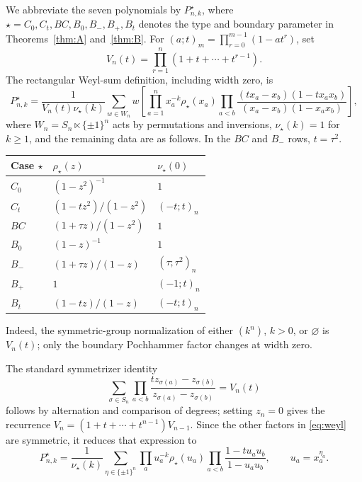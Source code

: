 \documentclass[12pt]{article}
\numberwithin{equation}{section}
\begin{document}
We abbreviate the seven polynomials by $P^\star_{n,k}$, where
$\star=C_0,C_t,BC,B_0,B_-,B_+,B_t$ denotes the type and boundary
parameter in Theorems~\ref{thm:A} and~\ref{thm:B}.
For $(a;t)_m=\prod_{r=0}^{m-1}(1-at^r)$, set
\[
 V_n(t)=\prod_{r=1}^n(1+t+\cdots+t^{r-1}).
\]
The rectangular Weyl-sum definition, including width zero, is
\begin{equation}\label{eq:weyl}
 P^\star_{n,k}
 =\frac{1}{V_n(t)\nu_\star(k)}
 \sum_{w\in W_n}w\left[
 \prod_{a=1}^n x_a^{-k}\rho_\star(x_a)
 \prod_{a<b}\frac{(tx_a-x_b)(1-tx_ax_b)}
                    {(x_a-x_b)(1-x_ax_b)}\right],
\end{equation}
where $W_n=S_n\ltimes\{\pm1\}^n$ acts by permutations and inversions,
$\nu_\star(k)=1$ for $k\ge1$, and the remaining data are as follows.
In the $BC$ and $B_-$ rows, $t=\tau^2$.
\begin{center}
\renewcommand{\arraystretch}{1.35}
\begin{tabular}{@{}lll@{}}
\toprule
Case $\star$ & $\rho_\star(z)$ & $\nu_\star(0)$\\
\midrule
$C_0$ & $(1-z^2)^{-1}$ & $1$\\
$C_t$ & $(1-tz^2)/(1-z^2)$ & $(-t;t)_n$\\
$BC$ & $(1+\tau z)/(1-z^2)$ & $1$\\
$B_0$ & $(1-z)^{-1}$ & $1$\\
$B_-$ & $(1+\tau z)/(1-z)$ & $(\tau;\tau^2)_n$\\
$B_+$ & $1$ & $(-1;t)_n$\\
$B_t$ & $(1-tz)/(1-z)$ & $(-t;t)_n$\\
\bottomrule
\end{tabular}
\end{center}
Indeed, the symmetric-group normalization of either $(k^n)$, $k>0$,
or $\varnothing$ is $V_n(t)$; only the boundary Pochhammer factor
changes at width zero.

The standard symmetrizer identity
\[
 \sum_{\sigma\in S_n}
 \prod_{a<b}\frac{tz_{\sigma(a)}-z_{\sigma(b)}}
                  {z_{\sigma(a)}-z_{\sigma(b)}}=V_n(t)
\]
follows by alternation and comparison of degrees; setting $z_n=0$
gives the recurrence $V_n=(1+t+\cdots+t^{n-1})V_{n-1}$.
Since the other factors in \eqref{eq:weyl} are symmetric, it reduces
that expression to
\begin{equation}\label{eq:signsum}
 P^\star_{n,k}
 =\frac{1}{\nu_\star(k)}
   \sum_{\eta\in\{\pm1\}^n}
   \prod_a u_a^{-k}\rho_\star(u_a)
   \prod_{a<b}\frac{1-tu_au_b}{1-u_au_b},
 \qquad u_a=x_a^{\eta_a}.
\end{equation}
\end{document}
